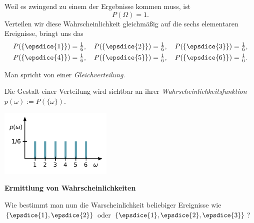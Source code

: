 \documentclass[9pt]{beamer}
\newcommand{\strong}[1]{\textsf{\textbf{#1}}}
\newcommand{\parspace}{\vspace{0.8em}}
\newcommand\dice[1]{\vcenter{\hbox{\epsdice{#1}}}}
\begin{document}
\begin{frame}[t]
\vspace{6em}
Weil es zwingend zu einem der Ergebnisse kommen muss, ist
\[P(\Omega) = 1.\]\pause
Verteilen wir diese Wahrscheinlichkeit gleichmäßig auf die sechs
elementaren Ereignisse, bringt uns das
\begin{gather*}
P(\{\dice{1}\}) = \tfrac{1}{6},\quad P(\{\dice{2}\}) = \tfrac{1}{6},\quad
P(\{\dice{3}\}) = \tfrac{1}{6},\\
P(\{\dice{4}\}) = \tfrac{1}{6},\quad P(\{\dice{5}\}) = \tfrac{1}{6},\quad
P(\{\dice{6}\}) = \tfrac{1}{6}.\\
\end{gather*}
\end{frame}

\begin{frame}[t]
\vspace{4.6em}
Man spricht von einer \emph{Gleichverteilung}.\pause

\parspace
Die Gestalt einer Verteilung wird sichtbar an ihrer
\emph{Wahrscheinlichkeitsfunktion} $p(\omega):=P(\{\omega\})$.\pause

\begin{center}
\includegraphics[width=54mm]{img/dice-uniform.pdf}
\end{center}
\end{frame}

\begin{frame}
\begin{center}
\strong{Ermittlung von Wahrscheinlichkeiten}
\end{center}
\end{frame}

\begin{frame}
Wie bestimmt man nun die Warscheinlichkeit beliebiger
Ereignisse wie $\{\dice{1},\dice{2}\}$ oder
$\{\dice{1},\dice{2},\dice{3}\}$?
\end{frame}
\end{document}
